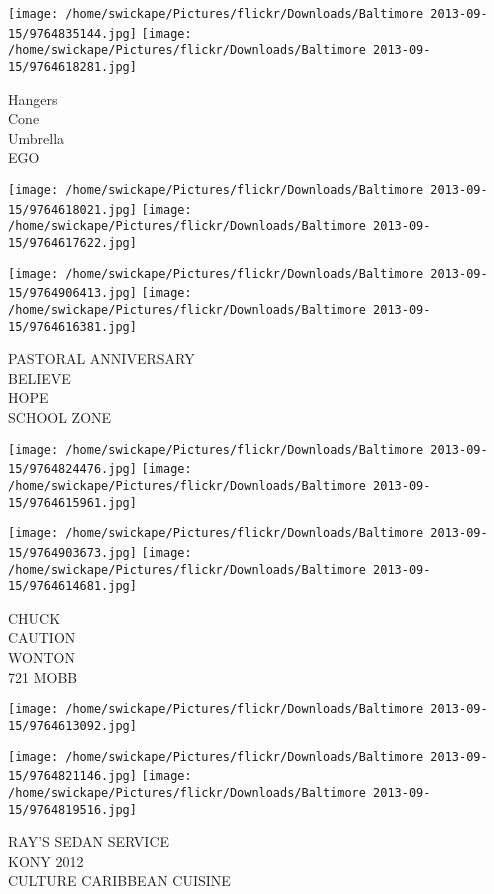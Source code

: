\documentclass[10pt,letterpaper]{article}
\begin{document}
\texttt{[image: /home/swickape/Pictures/flickr/Downloads/Baltimore 2013-09-15/9764835144.jpg]}
\texttt{[image: /home/swickape/Pictures/flickr/Downloads/Baltimore 2013-09-15/9764618281.jpg]}

Hangers\\
Cone\\
Umbrella\\
EGO
\pagebreak

\texttt{[image: /home/swickape/Pictures/flickr/Downloads/Baltimore 2013-09-15/9764618021.jpg]}
\texttt{[image: /home/swickape/Pictures/flickr/Downloads/Baltimore 2013-09-15/9764617622.jpg]}

\texttt{[image: /home/swickape/Pictures/flickr/Downloads/Baltimore 2013-09-15/9764906413.jpg]}
\texttt{[image: /home/swickape/Pictures/flickr/Downloads/Baltimore 2013-09-15/9764616381.jpg]}

PASTORAL ANNIVERSARY\\
BELIEVE\\
HOPE\\
SCHOOL ZONE
\pagebreak

\texttt{[image: /home/swickape/Pictures/flickr/Downloads/Baltimore 2013-09-15/9764824476.jpg]}
\texttt{[image: /home/swickape/Pictures/flickr/Downloads/Baltimore 2013-09-15/9764615961.jpg]}

\texttt{[image: /home/swickape/Pictures/flickr/Downloads/Baltimore 2013-09-15/9764903673.jpg]}
\texttt{[image: /home/swickape/Pictures/flickr/Downloads/Baltimore 2013-09-15/9764614681.jpg]}

CHUCK\\
CAUTION\\
WONTON\\
721 MOBB
\pagebreak

\texttt{[image: /home/swickape/Pictures/flickr/Downloads/Baltimore 2013-09-15/9764613092.jpg]}

\vspace{0.25in}
\texttt{[image: /home/swickape/Pictures/flickr/Downloads/Baltimore 2013-09-15/9764821146.jpg]}
\texttt{[image: /home/swickape/Pictures/flickr/Downloads/Baltimore 2013-09-15/9764819516.jpg]}

RAY'S SEDAN SERVICE\\
KONY 2012\\
CULTURE CARIBBEAN CUISINE
\pagebreak
\end{document}
